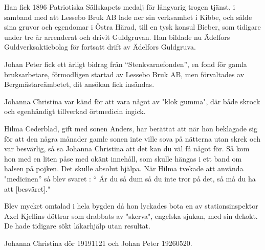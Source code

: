Han fick 1896 Patriotiska Sällskapets medalj för långvarig trogen tjänst, i samband med att Lessebo Bruk AB lade ner sin verksamhet i Kibbe, och sålde sina gruvor och egendomar i Östra Härad, till en tysk konsul Bieber, som tidigare under tre år arrenderat och drivit Guldgruvan. Han bildade nu Ädelfors Guldverksaktiebolag för fortsatt drift av Ädelfors Guldgruva.

Johan Peter fick ett årligt bidrag från ``Stenkvarnefonden'', en fond för gamla bruksarbetare, förmodligen startad av Lessebo Bruk AB, men förvaltades av Bergmästareämbetet, dit ansökan fick insändas.


Johanna Christina var känd för att vara något av "klok gumma", där både skrock och egenhändigt tillverkad örtmedicin ingick.

Hilma Cederblad, gift med sonen Anders, har berättat att när hon beklagade sig för att den några månader gamle sonen inte ville sova på nätterna utan skrek och var besvärlig, så sa Johanna Christina att det kan du väl få något för. Så kom hon med en liten påse med okänt innehåll, som skulle hängas i ett band om halsen på pojken. Det skulle absolut hjälpa. När Hilma tvekade att använda "medicinen'' så blev svaret : “ Är du så dum så du inte tror på det, så må du ha att [besväret]."

Blev mycket omtalad i hela bygden då hon lyckades bota en av stationsinspektor Axel Kjellins döttrar som drabbats av "skerva", engelska sjukan, med sin dekokt. De hade tidigare sökt läkarhjälp utan resultat.

Johanna Christina dör 19191121 och Johan Peter 19260520.



\bye
